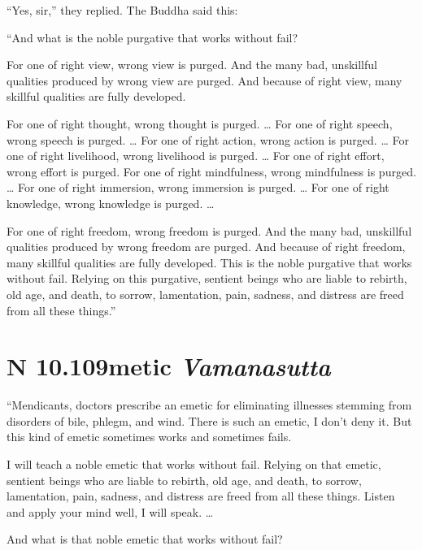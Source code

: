 \documentclass[12pt,openany]{book}%
\newcommand*{\suttatitleacronym}[1]{\smaller[2]{#1}\vspace*{.3em}}
\newcommand*{\suttatitletranslation}[1]{\linebreak{#1}}
\newcommand*{\suttatitleroot}[1]{\linebreak\smaller[2]\itshape{#1}}
\newcommand*{\tocacronym}[1]{\hspace*{-3.3em}{#1}\quad}
\newcommand*{\toctranslation}[1]{#1}
\newcommand*{\tocroot}[1]{(\textit{#1})}
\begin{document}
“Yes, sir,” they replied. The Buddha said this: 

“And what is the noble purgative that works without fail? 

For one of right view, wrong view is purged. And the many bad, unskillful qualities produced by wrong view are purged. And because of right view, many skillful qualities are fully developed. 

For one of right thought, wrong thought is purged. … For one of right speech, wrong speech is purged. … For one of right action, wrong action is purged. … For one of right livelihood, wrong livelihood is purged. … For one of right effort, wrong effort is purged. For one of right mindfulness, wrong mindfulness is purged. … For one of right immersion, wrong immersion is purged. … For one of right knowledge, wrong knowledge is purged. … 

For one of right freedom, wrong freedom is purged. And the many bad, unskillful qualities produced by wrong freedom are purged. And because of right freedom, many skillful qualities are fully developed. This is the noble purgative that works without fail. Relying on this purgative, sentient beings who are liable to rebirth, old age, and death, to sorrow, lamentation, pain, sadness, and distress are freed from all these things.” 

%
\section*{{\suttatitleacronym AN 10.109}{\suttatitletranslation Emetic }{\suttatitleroot Vamanasutta}}
\addcontentsline{toc}{section}{\tocacronym{AN 10.109} \toctranslation{Emetic } \tocroot{Vamanasutta}}

“Mendicants, doctors prescribe an emetic for eliminating illnesses stemming from disorders of bile, phlegm, and wind. There is such an emetic, I don’t deny it. But this kind of emetic sometimes works and sometimes fails. 

I will teach a noble emetic that works without fail. Relying on that emetic, sentient beings who are liable to rebirth, old age, and death, to sorrow, lamentation, pain, sadness, and distress are freed from all these things. Listen and apply your mind well, I will speak. … 

And what is that noble emetic that works without fail? 
\end{document}
